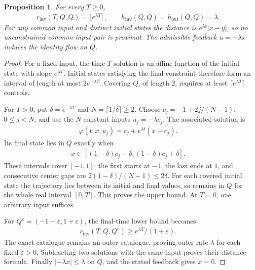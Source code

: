 \documentclass[11pt,a4paper]{article}
\newtheorem{proposition}[theorem]{Proposition}
\theoremstyle{definition}
\theoremstyle{remark}
\begin{document}
\begin{proposition}\label{prop:ct}
For every \(T\geq0\),
\begin{align*}
 r_{\mathrm{inv}}(T,Q,Q)=\lceil e^{\lambda T}\rceil,\qquad
 h_{\mathrm{inv}}(Q,Q)=h_{\mathrm{out}}(Q,Q)=\lambda.
\end{align*}
For any common input and distinct initial states the distance is
\(e^{\lambda t}|x-y|\), so no unconstrained common-input pair is proximal. The admissible feedback \(u=-\lambda x\) induces the identity flow on \(Q\).
\end{proposition}
\begin{proof}
For a fixed input, the time-\(T\) solution is an affine function of the initial state with slope \(e^{\lambda T}\). Initial states satisfying the final constraint therefore form an interval of length at most \(2e^{-\lambda T}\). Covering \(Q\), of length \(2\), requires at least \(\lceil e^{\lambda T}\rceil\) controls.

For \(T>0\), put \(\delta=e^{-\lambda T}\) and \(N=\lceil1/\delta\rceil\geq2\). Choose
\(c_j=-1+2j/(N-1)\), \(0\leq j<N\), and use the \(N\) constant inputs \(u_j=-\lambda c_j\). The associated solution is
\begin{align*}
 \varphi(t,x,u_j)=c_j+e^{\lambda t}(x-c_j).
\end{align*}
Its final state lies in \(Q\) exactly when
\begin{align*}
 x\in[(1-\delta)c_j-\delta,(1-\delta)c_j+\delta].
\end{align*}
These intervals cover \([-1,1]\): the first starts at \(-1\), the last ends at \(1\), and consecutive center gaps are
\(2(1-\delta)/(N-1)\leq2\delta\).
For each covered initial state the trajectory lies between its initial and final values, so remains in \(Q\) for the whole real interval \([0,T]\). This proves the upper bound. At \(T=0\), one arbitrary input suffices.

For \(Q^\varepsilon=(-1-\varepsilon,1+\varepsilon)\), the final-time lower bound becomes
\begin{align*}
 r_{\mathrm{inv}}(T,Q,Q^\varepsilon)\geq
             e^{\lambda T}/(1+\varepsilon).
\end{align*}
The exact catalogue remains an outer catalogue, proving outer rate \(\lambda\) for each fixed \(\varepsilon>0\). Subtracting two solutions with the same input proves their distance formula. Finally \(|-\lambda x|\leq\lambda\) on \(Q\), and the stated feedback gives \(\dot x=0\).
\end{proof}
\end{document}
